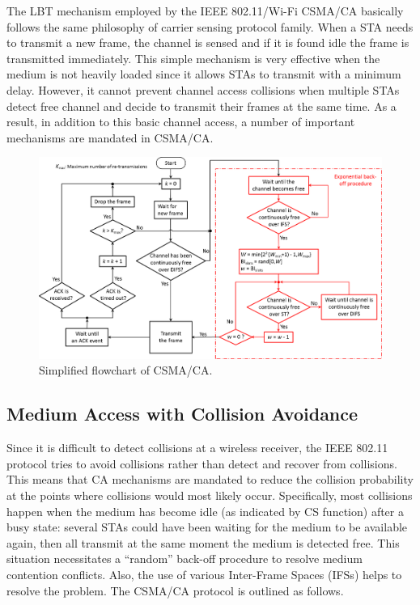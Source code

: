 The LBT mechanism employed by the IEEE 802.11/Wi-Fi CSMA/CA basically follows the same philosophy of carrier sensing protocol family. When a STA needs to transmit a new frame, the channel is sensed and if it is found idle the frame is transmitted immediately. This simple mechanism is very effective when the medium is not heavily loaded since it allows STAs to transmit with a minimum delay. However, it cannot prevent channel access collisions when multiple STAs detect free channel and decide to transmit their frames at the same time. As a result, in addition to this basic channel access, a number of important mechanisms are mandated in CSMA/CA.

\begin{figure}[!t]
	\centering
	\includegraphics[width=1.0\columnwidth]{figs/CSMA-CA-flowchart}
	\caption{Simplified flowchart of CSMA/CA.}
	\label{figs:CSMA-CA-flowchart}
\end{figure}


\subsection{Medium Access with Collision Avoidance}
\label{collision-avoidance}

Since it is difficult to detect collisions at a wireless receiver, the IEEE 802.11 protocol tries to avoid collisions rather than detect and recover from collisions. This means that CA mechanisms are mandated to reduce the collision probability at the points where collisions would most likely occur. Specifically, most collisions happen when the medium has become idle (as indicated by CS function) after a busy state: several STAs could have been waiting for the medium to be available again, then all transmit at the same moment the medium is detected free. This situation necessitates a ``random'' back-off procedure to resolve medium contention conflicts. Also, the use of various Inter-Frame Spaces (IFSs) helps to resolve the problem. The CSMA/CA protocol is outlined as follows.

